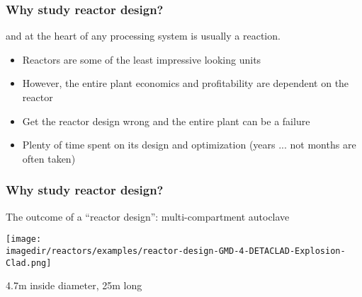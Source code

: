 \begin{frame}\frametitle{Why study reactor design?}
	\begin{exampleblock}{}
		\begin{center}
			{\color{myGreen}{Chemical Engineering is about ``processing'' material}}
		\end{center}
	\end{exampleblock}
	and at the heart of any processing system is usually a reaction.
	
	\vspace{12pt}
	\begin{itemize}
		\item	Reactors are some of the least impressive looking units
		\item	However, the entire plant economics and profitability are dependent on the reactor
		\item	Get the reactor design wrong and the entire plant can be a failure
		\item	Plenty of time spent on its design and optimization (years ... not months are often taken)
	\end{itemize}	
\end{frame}

\begin{frame}\frametitle{Why study reactor design?}
	The outcome of a ``reactor design'': multi-compartment autoclave
	\begin{center}
		\texttt{[image: \\imagedir/reactors/examples/reactor-design-GMD-4-DETACLAD-Explosion-Clad.png]}
		
		4.7m inside diameter, 25m long
	\end{center}
\end{frame}

